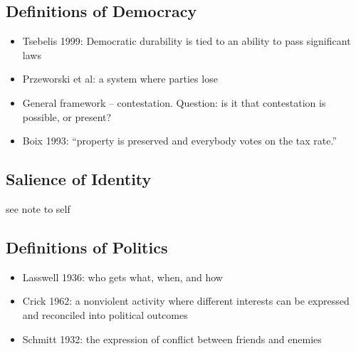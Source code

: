 \documentclass[12pt]{article}
\begin{document}
\subsection*{Definitions of Democracy}

\begin{itemize}
    \item Tsebelis 1999: Democratic durability is tied to an ability to pass significant laws
    \item Przeworski et al: a system where parties lose
    \item General framework -- contestation. Question: is it that contestation is possible, or present?
    \item Boix 1993: ``property is preserved and everybody votes on the tax rate.''
\end{itemize}



\subsection*{Salience of Identity}
 see note to self



 \subsection*{Definitions of Politics}

 \begin{itemize}
    \item Lasswell 1936: who gets what, when, and how
    \item Crick 1962: a nonviolent activity where different interests can be expressed and reconciled into political outcomes
    \item Schmitt 1932: the expression of conflict between friends and enemies
 \end{itemize}
\end{document}
